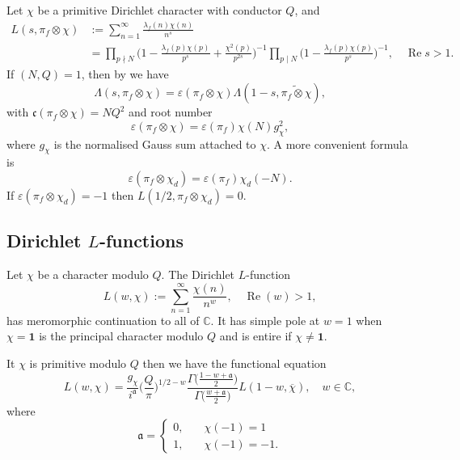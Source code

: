 \documentclass[12pt,reqno]{amsart}
\theoremstyle{plain}
\theoremstyle{remark}
\renewcommand{\Re}{\operatorname{Re}}
\numberwithin{equation}{section}
\numberwithin{lemma}{section}
\numberwithin{theorem}{section}
\numberwithin{prop}{section}
\numberwithin{remark}{section}
\begin{document}
Let $\chi$ be a primitive Dirichlet character with conductor $Q$, and 
\begin{align*}
L(s,\pi_f \otimes \chi)&:=\sum_{n=1}^{\infty} \frac{\lambda_f(n) \chi(n)}{n^s} \\
&=\prod_{p \nmid N} 
\Big(1-\frac{\lambda_f(p) \chi(p)}{p^{s}}+\frac{\chi^2(p)}{p^{2s}} \Big)^{-1}  \prod_{p \mid N}
\Big(1-\frac{\lambda_f(p) \chi(p)}{p^{s}} \Big)^{-1}, \quad \Re s>1.
\end{align*}
If $(N,Q)=1$, then by \cite[Proposition~14.20]{IK} we have
\begin{equation} \label{functionaleq2}
\Lambda(s,\pi_{f} \otimes \chi)=\varepsilon(\pi_f \otimes \chi) \Lambda(1-s,\widetilde{\pi_{f} \otimes \chi}),
\end{equation}
with $\mathfrak{c}(\pi_f \otimes \chi)=NQ^2$ and root number
\begin{equation} \label{twistroot1}
\varepsilon(\pi_f \otimes \chi)=\varepsilon(\pi_f) \chi(N) g^2_{\chi},
\end{equation}
where $g_{\chi}$ is the normalised Gauss sum attached to $\chi$.  
A more convenient formula is 
\begin{equation} \label{twistroot2}
\varepsilon(\pi_f \otimes \chi_d)=\varepsilon(\pi_f) \chi_d(-N).
\end{equation}
If $\varepsilon(\pi_f \otimes \chi_d)=-1$ then $L(1/2,\pi_f \otimes \chi_d)=0$.

\subsection{Dirichlet $L$-functions}
Let $\chi$ be a character modulo $Q$.
The Dirichlet $L$-function 
\begin{equation*}
L(w,\chi):=\sum_{n=1}^{\infty} \frac{\chi(n)}{n^{w}}, \quad \Re(w)>1,
\end{equation*}
has meromorphic continuation to all of $\mathbb{C}$. It has simple pole at $w=1$ when 
$\chi=\mathbf{1}$ is the principal character modulo $Q$ and is entire if $\chi \neq \mathbf{1}$. 

It $\chi$ is primitive modulo $Q$ then 
we have the functional equation 
\begin{equation} \label{dirtwistfunc}
L(w,\chi)= \frac{g_{\chi}}{i^{\mathfrak{a}}} 
\Big(\frac{Q}{\pi} \Big)^{1/2-w}
\frac{\Gamma \big(\frac{1-w+\mathfrak{a}}{2} \big)}{\Gamma \big( \frac{w+\mathfrak{a}}{2} \big)} 
L(1-w,\overline{\chi}), \quad w \in \mathbb{C},
\end{equation}
where 
\begin{equation*}
\mathfrak{a}=\begin{cases}
0, & \quad \chi(-1)=1 \\
1, &  \quad \chi(-1)=-1.
\end{cases} 
\end{equation*}
\end{document}
